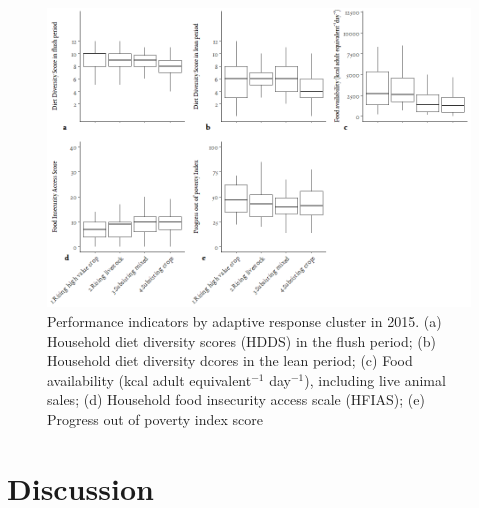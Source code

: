 \begin{figure}[H]
  \includegraphics[width=1\textwidth]{figs_04/image5.png}
  \captionsetup{singlelinecheck = off, justification=justified}
    \caption{Performance indicators by adaptive response cluster in 2015. (a) Household diet diversity scores (HDDS) in the flush period; (b) Household diet diversity dcores in the lean period; (c) Food availability (kcal adult equivalent$^{-1}$ day$^{-1}$), including live animal sales; (d) Household food insecurity access scale (HFIAS); (e) Progress out of poverty index score}
    \label{fig:04_4}

\end{figure}
\vspace*{-3mm}

\section{Discussion}

